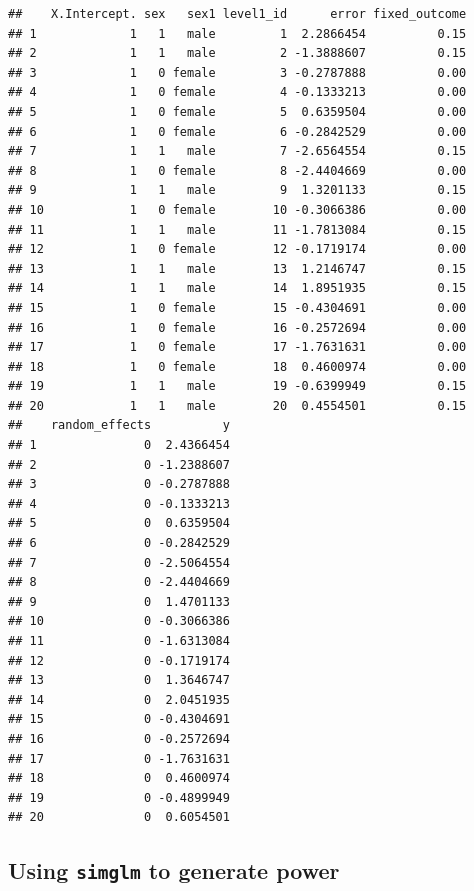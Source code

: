 \documentclass[man]{apa6}
\begin{document}
\begin{verbatim}
##    X.Intercept. sex   sex1 level1_id      error fixed_outcome
## 1             1   1   male         1  2.2866454          0.15
## 2             1   1   male         2 -1.3888607          0.15
## 3             1   0 female         3 -0.2787888          0.00
## 4             1   0 female         4 -0.1333213          0.00
## 5             1   0 female         5  0.6359504          0.00
## 6             1   0 female         6 -0.2842529          0.00
## 7             1   1   male         7 -2.6564554          0.15
## 8             1   0 female         8 -2.4404669          0.00
## 9             1   1   male         9  1.3201133          0.15
## 10            1   0 female        10 -0.3066386          0.00
## 11            1   1   male        11 -1.7813084          0.15
## 12            1   0 female        12 -0.1719174          0.00
## 13            1   1   male        13  1.2146747          0.15
## 14            1   1   male        14  1.8951935          0.15
## 15            1   0 female        15 -0.4304691          0.00
## 16            1   0 female        16 -0.2572694          0.00
## 17            1   0 female        17 -1.7631631          0.00
## 18            1   0 female        18  0.4600974          0.00
## 19            1   1   male        19 -0.6399949          0.15
## 20            1   1   male        20  0.4554501          0.15
##    random_effects          y
## 1               0  2.4366454
## 2               0 -1.2388607
## 3               0 -0.2787888
## 4               0 -0.1333213
## 5               0  0.6359504
## 6               0 -0.2842529
## 7               0 -2.5064554
## 8               0 -2.4404669
## 9               0  1.4701133
## 10              0 -0.3066386
## 11              0 -1.6313084
## 12              0 -0.1719174
## 13              0  1.3646747
## 14              0  2.0451935
## 15              0 -0.4304691
## 16              0 -0.2572694
## 17              0 -1.7631631
## 18              0  0.4600974
## 19              0 -0.4899949
## 20              0  0.6054501
\end{verbatim}

\hypertarget{using-simglm-to-generate-power}{%
\subsection{\texorpdfstring{Using \texttt{simglm} to generate power}{Using simglm to generate power}}\label{using-simglm-to-generate-power}}
\end{document}
